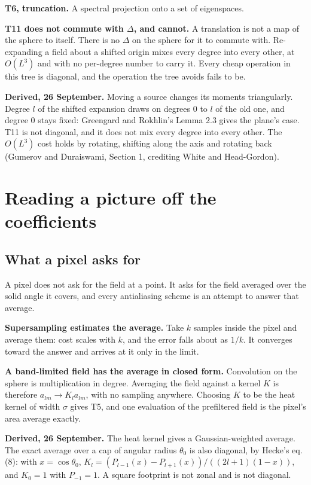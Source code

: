 \textbf{T6, truncation.} A spectral projection onto a set of eigenspaces.

\textbf{T11 does not commute with \(\Delta\), and cannot.} A translation is not a map of the sphere to itself. There is no \(\Delta\) on the sphere for it to commute with. Re-expanding a field about a shifted origin mixes every degree into every other, at \(O(L^3)\) and with no per-degree number to carry it. Every cheap operation in this tree is diagonal, and the operation the tree avoids fails to be.

\textbf{Derived, 26 September.} Moving a source changes its moments triangularly. Degree \(l\) of the shifted expansion draws on degrees \(0\) to \(l\) of the old one, and degree \(0\) stays fixed: Greengard and Rokhlin's Lemma 2.3 gives the plane's case. T11 is not diagonal, and it does not mix every degree into every other. The \(O(L^3)\) cost holds by rotating, shifting along the axis and rotating back (Gumerov and Duraiswami, Section 1, crediting White and Head-Gordon).

\section{Reading a picture off the coefficients}

\subsection{What a pixel asks for}

A pixel does not ask for the field at a point. It asks for the field averaged over the solid angle it covers, and every antialiasing scheme is an attempt to answer that average.

\textbf{Supersampling estimates the average.} Take \(k\) samples inside the pixel and average them: cost scales with \(k\), and the error falls about as \(1/k\). It converges toward the answer and arrives at it only in the limit.

\textbf{A band-limited field has the average in closed form.} Convolution on the sphere is multiplication in degree. Averaging the field against a kernel \(K\) is therefore \(a_{lm} \to K_l a_{lm}\), with no sampling anywhere. Choosing \(K\) to be the heat kernel of width \(\sigma\) gives T5, and one evaluation of the prefiltered field is the pixel's area average exactly.

\textbf{Derived, 26 September.} The heat kernel gives a Gaussian-weighted average. The exact average over a cap of angular radius \(\theta_0\) is also diagonal, by Hecke's eq. (8): with \(x = \cos\theta_0\), \(K_l = (P_{l-1}(x) - P_{l+1}(x)) / ((2l+1)(1-x))\), and \(K_0 = 1\) with \(P_{-1} = 1\). A square footprint is not zonal and is not diagonal.

